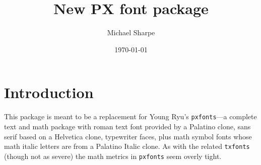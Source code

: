 \documentclass[11pt]{article}
\title{New PX font package}
\author{Michael Sharpe}
\date{\today}  %
\theoremstyle{oldplain}
\theoremstyle{plain}
\def\pcf{\addfontfeatures{Letters=PetiteCaps}}
\def\pcf{\addfontfeatures{Letters=SmallCaps}}
\begin{document}
%
\maketitle
%
%
%


\section{Introduction}
This package is meant to be  a replacement for Young Ryu's {\tt pxfonts}---a complete text and math package with roman text font provided by a Palatino clone, sans serif based on a \textsf{Helvetica} clone, typewriter faces, plus math symbol fonts whose math italic letters are from a Palatino Italic clone. As with the related {\tt txfonts} (though not as severe) the math metrics in {\tt pxfonts} seem overly tight.
\end{document}
